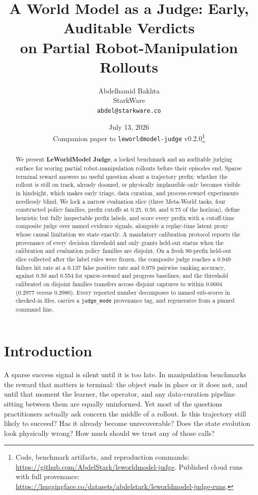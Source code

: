 \documentclass[11pt]{article}
\title{A World Model as a Judge: Early, Auditable Verdicts\\on Partial Robot-Manipulation Rollouts}
\author{%
  Abdelhamid Bakhta\\
  StarkWare\\
  \texttt{abdel@starkware.co}%
}
\date{July 13, 2026\\[0.4em]
\small Companion paper to \texttt{leworldmodel-judge} v0.2.0\thanks{Code, benchmark
artifacts, and reproduction commands: \url{https://github.com/AbdelStark/leworldmodel-judge}.
Published cloud runs with full provenance: \url{https://huggingface.co/datasets/abdelstark/leworldmodel-judge-runs}.}}
\newcommand{\judgemode}[1]{\texttt{#1}}
\begin{document}
\maketitle

\begin{abstract}
We present \textbf{LeWorldModel Judge}, a locked benchmark and an auditable judging surface
for scoring partial robot-manipulation rollouts before their episodes end. Sparse terminal
reward answers no useful question about a trajectory prefix: whether the rollout is still on
track, already doomed, or physically implausible only becomes visible in hindsight, which
makes early triage, data curation, and process-reward experiments needlessly blind. We lock a
narrow evaluation slice (three Meta-World tasks, four constructed policy families, prefix
cutoffs at 0.25, 0.50, and 0.75 of the horizon), define heuristic but fully inspectable
prefix labels, and score every prefix with a cutoff-time composite judge over named evidence
signals, alongside a replay-time latent proxy whose causal limitation we state exactly. A
mandatory calibration protocol reports the provenance of every decision threshold and only
grants held-out status when the calibration and evaluation policy families are disjoint.
On a fresh 90-prefix held-out slice collected after the label rules were frozen, the
composite judge reaches a 0.949 failure hit rate at a 0.137 false positive rate and 0.978
pairwise ranking accuracy, against 0.50 and 0.554 for sparse-reward and progress baselines,
and the threshold calibrated on disjoint families transfers across disjoint captures to
within 0.0004 (0.2977 versus 0.2980). Every reported number decomposes to named sub-scores in
checked-in files, carries a \judgemode{judge\_mode} provenance tag, and regenerates from a
pinned command line.
\end{abstract}

\section{Introduction}
\label{sec:intro}

A sparse success signal is silent until it is too late. In manipulation benchmarks the reward
that matters is terminal: the object ends in place or it does not, and until that moment the
learner, the operator, and any data-curation pipeline sitting between them are equally
uninformed. Yet most of the questions practitioners actually ask concern the middle of a
rollout. Is this trajectory still likely to succeed? Has it already become unrecoverable?
Does the state evolution look physically wrong? How much should we trust any of those calls?
\end{document}
